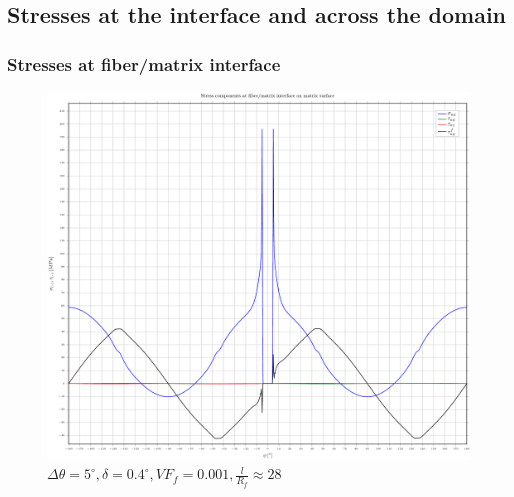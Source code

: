\documentclass[first,firstsupp,lastsupp,handout,last,hyperref,table]{ETHclass}
\begin{document}
\subsection[Stresses]{Stresses at the interface and across the domain}

\begin{frame}
\frametitle{Stresses at fiber/matrix interface}
\vspace{-0.35cm}
\centering
\captionsetup[subfigure]{font=scriptsize,labelfont=scriptsize}
\begin{figure}[!h]
\centering
\includegraphics[height=0.7\textheight]{AllStressesOnSlave.pdf}
 \caption{$\Delta\theta=5^{\circ},\delta=0.4^{\circ},VF_{f}=0.001,\frac{l}{R_{f}}\approx28$}
  \label{fig:allstressesonslave}
\end{figure}
\end{frame}
\end{document}

